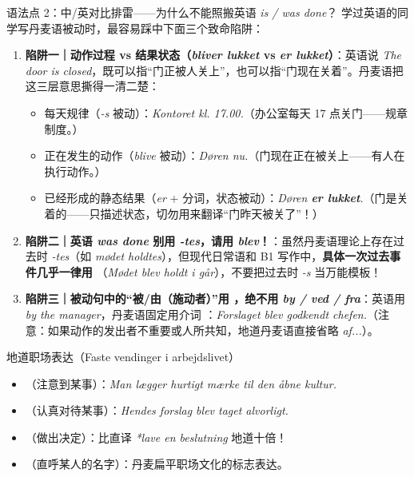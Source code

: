 \begin{grammatikbox}{语法点 2：中/英对比排雷——为什么不能照搬英语 \textit{is / was done}？}
学过英语的同学写丹麦语被动时，最容易踩中下面三个致命陷阱：
\begin{enumerate}
  \item \textbf{陷阱一｜动作过程 vs 结果状态（\textit{bliver lukket} vs \textit{er lukket}）}：英语说 \textit{The door is closed}，既可以指“门正被人关上”，也可以指“门现在关着”。丹麦语把这三层意思撕得一清二楚：
    \begin{itemize}
      \item 每天规律（\textit{-s} 被动）：\textit{Kontoret  kl. 17.00.}（办公室每天 17 点关门——规章制度。）
      \item 正在发生的动作（\textit{blive} 被动）：\textit{Døren  nu.}（门现在正在被关上——有人在执行动作。）
      \item 已经形成的静态结果（\textit{er} + 分词，状态被动）：\textit{Døren \textbf{er lukket}.}（门是关着的——只描述状态，切勿用来翻译“门昨天被关了”！）
    \end{itemize}
  \item \textbf{陷阱二｜英语 \textit{was done} 别用 \textit{-tes}，请用 \textit{blev}！}：虽然丹麦语理论上存在过去时 \textit{-tes}（如 \textit{mødet holdtes}），但现代日常语和 B1 写作中，\textbf{具体一次过去事件几乎一律用 }（\textit{Mødet blev holdt i går}），不要把过去时 \textit{-s} 当万能模板！
  \item \textbf{陷阱三｜被动句中的“被/由（施动者）”用 ，绝不用 \textit{by / ved / fra}}：英语用 \textit{by the manager}，丹麦语固定用介词 ：\textit{Forslaget blev godkendt  chefen.}（注意：如果动作的发出者不重要或人所共知，地道丹麦语直接省略 \textit{af...}）。
\end{enumerate}
\end{grammatikbox}

\begin{grammatikbox}{地道职场表达（Faste vendinger i arbejdslivet）}
\begin{itemize}
  \item {}（注意到某事）：\textit{Man lægger hurtigt mærke til den åbne kultur.}
  \item {}（认真对待某事）：\textit{Hendes forslag blev taget alvorligt.}
  \item {}（做出决定）：比直译 \textit{*lave en beslutning} 地道十倍！
  \item {}（直呼某人的名字）：丹麦扁平职场文化的标志表达。
\end{itemize}
\end{grammatikbox}

